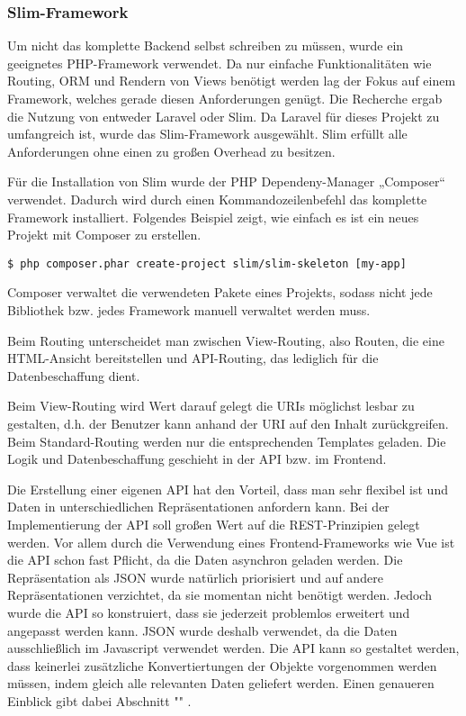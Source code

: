 \subsubsection{Slim-Framework}  
\label{sec:Slim-Framework-1}

Um nicht das komplette Backend selbst schreiben zu müssen, wurde ein geeignetes PHP-Framework verwendet. Da nur einfache Funktionalitäten wie Routing, \ac{ORM} und Rendern von Views benötigt werden lag der Fokus auf einem Framework, welches gerade diesen Anforderungen genügt. Die Recherche ergab die Nutzung von entweder Laravel oder Slim. Da Laravel für dieses Projekt zu umfangreich ist, wurde das Slim-Framework ausgewählt. Slim erfüllt alle Anforderungen ohne einen zu großen Overhead zu besitzen. 

Für die Installation von Slim wurde der PHP Dependeny-Manager „Composer“ verwendet. Dadurch wird durch einen Kommandozeilenbefehl das komplette Framework installiert.
Folgendes Beispiel zeigt, wie einfach es ist ein neues Projekt mit Composer zu erstellen.
 
\begin{lstlisting}[frame=single] 
$ php composer.phar create-project slim/slim-skeleton [my-app]
\end{lstlisting}

Composer verwaltet die verwendeten Pakete eines Projekts, sodass nicht jede Bibliothek bzw. jedes Framework manuell verwaltet werden muss.	

Beim Routing unterscheidet man zwischen View-Routing, also Routen, die eine HTML-Ansicht bereitstellen und API-Routing, das lediglich für die Datenbeschaffung dient. 

Beim View-Routing wird Wert darauf gelegt die URIs möglichst lesbar zu gestalten, d.h. der Benutzer kann anhand der URI auf den Inhalt zurückgreifen. 
Beim Standard-Routing werden nur die entsprechenden Templates geladen. Die Logik und Datenbeschaffung geschieht in der API bzw. im Frontend.

Die Erstellung einer eigenen API hat den Vorteil, dass man sehr flexibel ist und Daten in unterschiedlichen Repräsentationen anfordern kann. Bei der Implementierung der API soll großen Wert auf die REST-Prinzipien gelegt werden. 
Vor allem durch die Verwendung eines Frontend-Frameworks wie Vue ist die API schon fast Pflicht, da die Daten asynchron geladen werden.
Die Repräsentation als JSON wurde natürlich priorisiert und auf andere Repräsentationen verzichtet, da sie momentan nicht benötigt werden. Jedoch wurde die API so konstruiert, dass sie jederzeit problemlos erweitert und angepasst werden kann. JSON wurde deshalb verwendet, da die Daten ausschließlich im Javascript verwendet werden. Die API kann so gestaltet werden, dass keinerlei zusätzliche Konvertiertungen der Objekte vorgenommen werden müssen, indem gleich alle relevanten Daten geliefert werden.
Einen genaueren Einblick gibt dabei Abschnitt "" .

